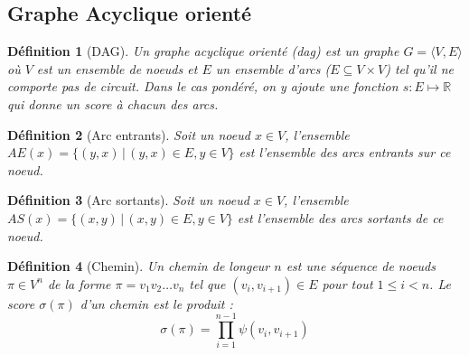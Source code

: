 \documentclass[11pt,openany]{book}
\newtheorem{definition}{Définition}[chapter]
\newcommand{\ac}[1]{{\sc #1}} %
\begin{document}
\begin{center}
\end{center}



\subsection{Graphe Acyclique orienté}

\begin{definition}[DAG] 
Un graphe acyclique orienté (\ac{dag}) est un graphe $G = \langle V,E \rangle$ où $V$ est un ensemble de noeuds et $E$ un ensemble d'arcs
($E \subseteq V\times V$) tel qu'il ne comporte pas de circuit.
Dans le cas pondéré, on  y ajoute une fonction $s: E \mapsto \mathbb{R}$
qui donne un score à chacun des arcs.
\end{definition}

\begin{definition}[Arc entrants] 
Soit un noeud $x\in V$, l'ensemble $AE(x) = \{(y,x) \,|\, (y,x) \in E , y \in V \}$ est l'ensemble des arcs entrants sur ce noeud. 
\end{definition}

\begin{definition}[Arc sortants] 
Soit un noeud $x\in V$, l'ensemble $AS(x) = \{(x,y) \,|\, (x,y) \in E , y \in V \}$ est l'ensemble des arcs sortants de ce noeud. 
\end{definition}

\begin{definition}[Chemin]
Un chemin de longeur $n$ est une séquence de noeuds $\pi \in V^n$ de la forme $\pi = v_1 v_2\ldots v_n$ tel que $(v_i,v_{i+1}) \in E$ pour tout $1\leq i < n$. Le score $\sigma(\pi)$ d'un chemin est le produit :
\begin{displaymath}
\sigma(\pi) = \prod_{i=1}^{n-1} \psi(v_i,v_{i+1}) 
\end{displaymath}
\end{definition}
\end{document}

